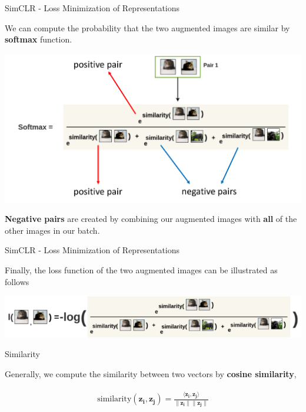 \documentclass[aspectratio=169,mathserif]{beamer}  %
\newcommand{\tb}{\textbf}
\begin{document}
\begin{frame}{SimCLR - Loss Minimization of Representations}

We can compute the probability that the two augmented images are similar by \tb{softmax} function.

\begin{center}
\includegraphics[width=0.7\linewidth]{figure11.pdf}   
\end{center}

\pause

\tb{Negative pairs} are created by combining our augmented images with \tb{all} of the other images in our batch.

\end{frame}



\begin{frame}{SimCLR - Loss Minimization of Representations}

Finally, the loss function of the two augmented images can be illustrated as follows

\begin{center}
\includegraphics[width=\linewidth]{figure8.png}   
\end{center}

\end{frame}




\begin{frame}{Similarity}

Generally, we compute the similarity between two vectors by \tb{cosine similarity},

\begin{eqnarray*}
\begin{aligned}
\text{similarity}(\bm{z_i, z_j})=\bm{\frac{\langle z_i, z_j \rangle}{\|z_i\|\|z_j\|}}
\end{aligned}    
\end{eqnarray*}

\end{frame}
\end{document}
